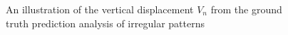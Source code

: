 \documentclass[preprint,3p,times,twocolumn]{elsarticle}  %
\begin{document}
\begin{figure}%
%
\centering
{}
%
\caption{An illustration of the vertical displacement $V_n$ from 
the ground truth prediction analysis of irregular patterns}\label{fig:2}
\end{figure}
\end{document}

